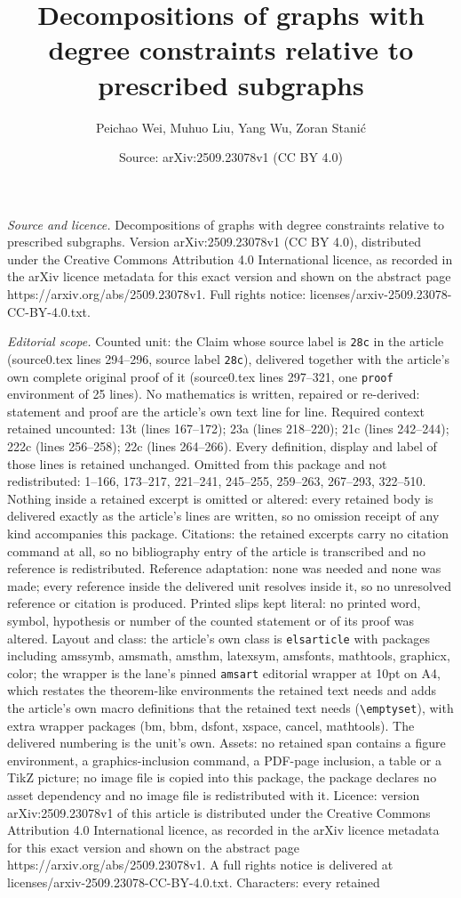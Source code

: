\documentclass[10pt,a4paper]{amsart}
\title[Decompositions of graphs with degree constraints relative to]{Decompositions of graphs with degree constraints relative to prescribed subgraphs}
\author{Peichao Wei, Muhuo Liu, Yang Wu, Zoran Stani\' c}
\date{Source: arXiv:2509.23078v1 (CC BY 4.0)}
\begin{document}
\maketitle

\noindent\emph{Source and licence.} Decompositions of graphs with degree constraints relative to prescribed subgraphs. Version arXiv:2509.23078v1 (CC BY 4.0), distributed under the Creative Commons Attribution 4.0 International licence, as recorded in the arXiv licence metadata for this exact version and shown on the abstract page https://arxiv.org/abs/2509.23078v1. Full rights notice: licenses/arxiv-2509.23078-CC-BY-4.0.txt.\par\smallskip

\noindent\textit{Editorial scope.} Counted unit: the Claim whose source label is \texttt{28c} in the article (source0.tex lines 294--296, source label \texttt{28c}), delivered together with the article's own complete original proof of it (source0.tex lines 297--321, one \texttt{proof} environment of 25 lines). No mathematics is written, repaired or re-derived: statement and proof are the article's own text line for line. Required context retained uncounted: 13t (lines 167--172); 23a (lines 218--220); 21c (lines 242--244); 222c (lines 256--258); 22c (lines 264--266). Every definition, display and label of those lines is retained unchanged. Omitted from this package and not redistributed: 1--166, 173--217, 221--241, 245--255, 259--263, 267--293, 322--510. Nothing inside a retained excerpt is omitted or altered: every retained body is delivered exactly as the article's lines are written, so no omission receipt of any kind accompanies this package. Citations: the retained excerpts carry no citation command at all, so no bibliography entry of the article is transcribed and no reference is redistributed. Reference adaptation: none was needed and none was made; every reference inside the delivered unit resolves inside it, so no unresolved reference or citation is produced. Printed slips kept literal: no printed word, symbol, hypothesis or number of the counted statement or of its proof was altered. Layout and class: the article's own class is \texttt{elsarticle} with packages including amssymb, amsmath, amsthm, latexsym, amsfonts, mathtools, graphicx, color; the wrapper is the lane's pinned \texttt{amsart} editorial wrapper at 10pt on A4, which restates the theorem-like environments the retained text needs and adds the article's own macro definitions that the retained text needs (\texttt{\textbackslash emptyset}), with extra wrapper packages (bm, bbm, dsfont, xspace, cancel, mathtools). The delivered numbering is the unit's own. Assets: no retained span contains a figure environment, a graphics-inclusion command, a PDF-page inclusion, a table or a TikZ picture; no image file is copied into this package, the package declares no asset dependency and no image file is redistributed with it. Licence: version arXiv:2509.23078v1 of this article is distributed under the Creative Commons Attribution 4.0 International licence, as recorded in the arXiv licence metadata for this exact version and shown on the abstract page https://arxiv.org/abs/2509.23078v1. A full rights notice is delivered at licenses/arxiv-2509.23078-CC-BY-4.0.txt. Characters: every retained 
\end{document}
